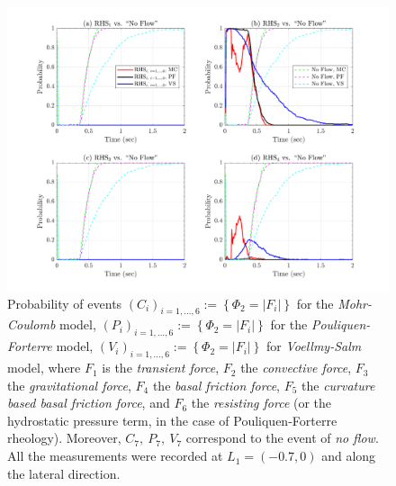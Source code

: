 \documentclass{article}
\begin{document}
\begin{figure}[H]
        \centering
        \includegraphics[width=1\textwidth]{InclinedPlane/Dominance1/DominancePrY_L1.png}
        \caption{Probability of events $(C_i)_{i=1,...,6}:=\left\{\Phi_2=|F_i|\right\}$ for the \emph{Mohr-Coulomb} model, $(P_i)_{i=1,...,6}:=\left\{\Phi_2=|F_i|\right\}$ for the \emph{Pouliquen-Forterre} model, $(V_i)_{i=1,...,6}:=\left\{\Phi_2=|F_i|\right\}$ for \emph{Voellmy-Salm} model, where $F_1$ is the \emph{transient force}, $F_2$ the \emph{convective force}, $F_3$ the \emph{gravitational force}, $F_4$ the \emph{basal friction force}, $F_5$ the \emph{curvature based basal friction force}, and $F_6$ the \emph{resisting force} (or the hydrostatic pressure term, in the case of Pouliquen-Forterre rheology). Moreover, $C_7,\ P_7,\ V_7$ correspond to the event of \emph{no flow}. All the measurements were recorded at $L_1=(-0.7,0)$ and along the lateral direction.}
        \label{fig:Ramp-FYDominance1-L1}
\end{figure}
\end{document}
